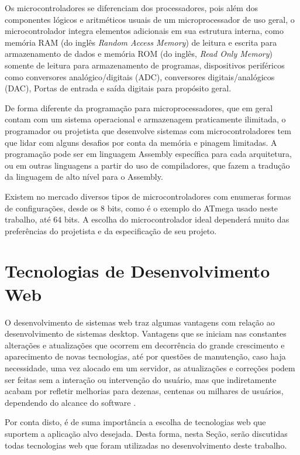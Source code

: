 \documentclass[tcc,capa]{texufpel}
\begin{document}
        Os microcontroladores se diferenciam dos processadores, pois além dos componentes lógicos e aritméticos usuais de um microprocessador de uso geral, o microcontrolador integra elementos adicionais em sua estrutura interna, como memória RAM (do inglês \textit{Random Access Memory}) de leitura e escrita para armazenamento de dados e  memória ROM (do inglês, \textit{Read Only Memory}) somente de leitura para armazenamento de programas, dispositivos periféricos como conversores analógico/digitais (ADC), conversores digitais/analógicos (DAC), Portas de entrada e saída digitais para propósito geral.
        
        De forma diferente da programação para microprocessadores, que em geral contam com um sistema operacional e armazenagem praticamente ilimitada, o programador ou projetista que desenvolve sistemas com microcontroladores tem que lidar com alguns desafios por conta da memória e pinagem limitadas. A programação pode ser em linguagem Assembly específica para cada arquitetura, ou em outras linguagens a partir do uso de compiladores, que fazem a tradução da linguagem de alto nível para o Assembly.
        
        Existem no mercado diversos tipos de microcontroladores com enumeras formas de configurações, desde os 8 bits, como é o exemplo do ATmega usado neste trabalho, até 64 bits. A escolha do microcontrolador ideal dependerá muito das preferências do projetista e da especificação de seu projeto. 
    
    
    \section{Tecnologias de Desenvolvimento Web}
    
        O desenvolvimento de sistemas web traz algumas vantagens com relação ao desenvolvimento de sistemas desktop. Vantagens que se iniciam nas constantes alterações e atualizações que ocorrem em decorrência do grande crescimento e   aparecimento de novas tecnologias, até por questões de manutenção, caso haja necessidade, uma vez alocado em um servidor, as atualizações e correções  podem  ser  feitas  sem  a  interação  ou  intervenção do usuário, mas que indiretamente  acabam  por  refletir  melhorias  para dezenas,  centenas  ou  milhares  de usuários, dependendo do alcance do software \cite{bodot2002desenvolvimento}. 
        
        Por conta disto, é de suma importância a escolha de tecnologias web que suportem a aplicação alvo desejada. Desta forma, nesta Seção, serão discutidas todas tecnologias web que foram utilizadas no desenvolvimento deste trabalho. 
    
\end{document}
